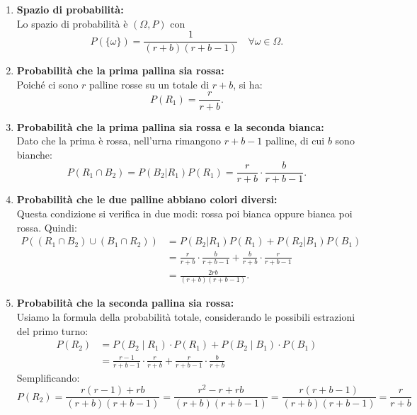 \begin{enumerate}[label=(\alph*)]
    \item \textbf{Spazio di probabilità:}\\
    Lo spazio di probabilità è \((\Omega, P)\) con
    \[
        P(\{ \omega \}) = \frac{1}{(r+b)(r+b-1)} \quad \forall \omega \in \Omega.
    \]
    
    \item \textbf{Probabilità che la prima pallina sia rossa:}\\[1mm]
    Poiché ci sono \(r\) palline rosse su un totale di \(r+b\), si ha:
    \[
        P(R_1) = \frac{r}{r+b}.
    \]
    
    \item \textbf{Probabilità che la prima pallina sia rossa e la seconda bianca:}\\[1mm]
    Dato che la prima è rossa, nell’urna rimangono \(r+b-1\) palline, di cui \(b\) sono bianche:
    \[
        P(R_1 \cap B_2) = P(B_2 | R_1) P(R_1) =\frac{r}{r+b} \cdot \frac{b}{r+b-1}.
    \]
    
    \item \textbf{Probabilità che le due palline abbiano colori diversi:}\\[1mm]
    Questa condizione si verifica in due modi: rossa poi bianca oppure bianca poi rossa. Quindi:
    \[
        \begin{split}
            P((R_1 \cap B_2)\cup (B_1 \cap R_2)) & =P(B_2 | R_1) P(R_1) + P(R_2 | B_1) P(B_1)\\
                    &= \frac{r}{r+b} \cdot \frac{b}{r+b-1} + \frac{b}{r+b} \cdot \frac{r}{r+b-1} \\
                    &= \frac{2rb}{(r+b)(r+b-1)}.
        \end{split}
    \]
    \item \textbf{Probabilità che la seconda pallina sia rossa:}\\[1mm]
    Usiamo la formula della probabilità totale, considerando le possibili estrazioni del primo turno:
    \[
    \begin{split}
    P(R_2) &= P(B_2 \mid R_1) \cdot P(R_1)  + P(B_2 \mid B_1) \cdot P(B_1)\\[1mm]
    &= \frac{r-1}{r+b-1} \cdot \frac{r}{r+b} + \frac{r}{r+b-1} \cdot \frac{b}{r+b}
    \end{split}
    \]
    Semplificando:
    \[
    P(R_2) = \frac{r(r-1) + rb}{(r+b)(r+b-1)} = \frac{r^2 - r + rb}{(r+b)(r+b-1)} = \frac{r(r+b-1)}{(r+b)(r+b-1)} = \frac{r}{r+b}
    \]
\end{enumerate}

